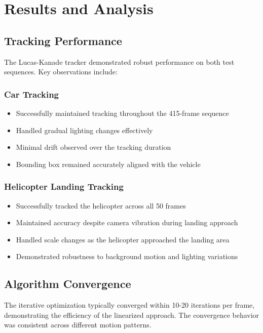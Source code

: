 \documentclass[12pt,a4paper]{article}
\begin{document}
\section{Results and Analysis}

\subsection{Tracking Performance}

The Lucas-Kanade tracker demonstrated robust performance on both test sequences. Key observations include:

\subsubsection{Car Tracking}
\begin{itemize}
\item Successfully maintained tracking throughout the 415-frame sequence
\item Handled gradual lighting changes effectively
\item Minimal drift observed over the tracking duration
\item Bounding box remained accurately aligned with the vehicle
\end{itemize}

\subsubsection{Helicopter Landing Tracking}
\begin{itemize}
\item Successfully tracked the helicopter across all 50 frames
\item Maintained accuracy despite camera vibration during landing approach
\item Handled scale changes as the helicopter approached the landing area
\item Demonstrated robustness to background motion and lighting variations
\end{itemize}

\subsection{Algorithm Convergence}

The iterative optimization typically converged within 10-20 iterations per frame, demonstrating the efficiency of the linearized approach. The convergence behavior was consistent across different motion patterns.
\end{document}
